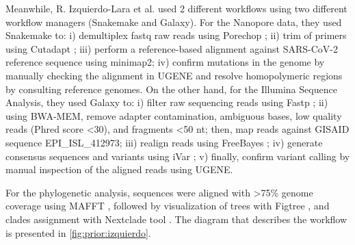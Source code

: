         Meanwhile, R. Izquierdo-Lara et al. \cite{izquierdo} used 2 different workflows using two different workflow managers (Snakemake and Galaxy). For the Nanopore data, they used Snakemake to: i) demultiplex \acrshort{fastq} raw reads using Porechop \cite{wick2022}; ii) trim of primers using Cutadapt \cite{martin2011}; iii) perform a reference-based alignment against SARS-CoV-2 reference sequence using minimap2; iv) confirm mutations in the genome by manually checking the alignment in UGENE \cite{okonechnikov2012} and resolve homopolymeric regions by consulting reference genomes. On the other hand, for the Illumina Sequence Analysis, they used Galaxy to: i) filter raw sequencing reads using Fastp \cite{chen2018}; ii) using BWA-MEM, remove adapter contamination, ambiguous bases, low quality reads (Phred score <30), and fragments <50 nt; then, map reads against GISAID sequence EPI\_ISL\_412973; iii) realign reads using FreeBayes \cite{garrison2012}; iv) generate consensus sequences and variants using iVar \cite{grubaugh2019}; v) finally, confirm variant calling by manual inspection of the aligned reads using UGENE.

        For the phylogenetic analysis, sequences were aligned with >75\% genome coverage using MAFFT \cite{mafft}, followed by visualization of trees with Figtree \cite{figtree}, and clades assignment with Nextclade tool \cite{nextclade2022}. The diagram that describes the workflow is presented in \cref{fig:prior:izquierdo}.
        
